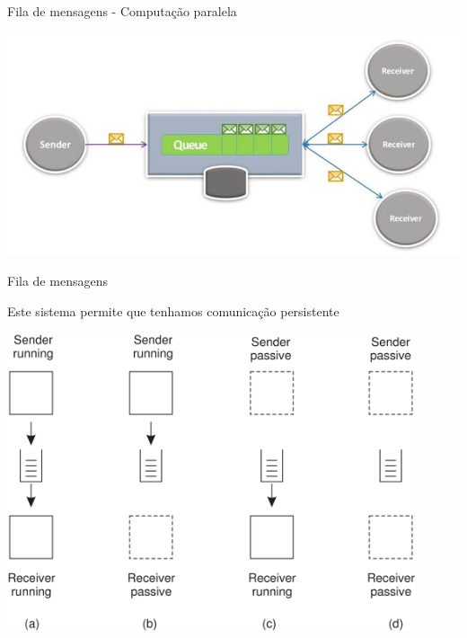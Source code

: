 \documentclass[compress]{beamer}
\begin{document}

\begin{frame}{Fila de mensagens - Computação paralela}

\vspace{0.5cm}

\centering \includegraphics[width=\textwidth]{images/queue_paralela.png}

\end{frame}


\begin{frame}{Fila de mensagens}

Este sistema permite que tenhamos comunicação persistente

\vspace{0.75cm}

\centering\includegraphics[width=0.9\textwidth]{images/transmissao_filas.png}

\end{frame}
\end{document}
